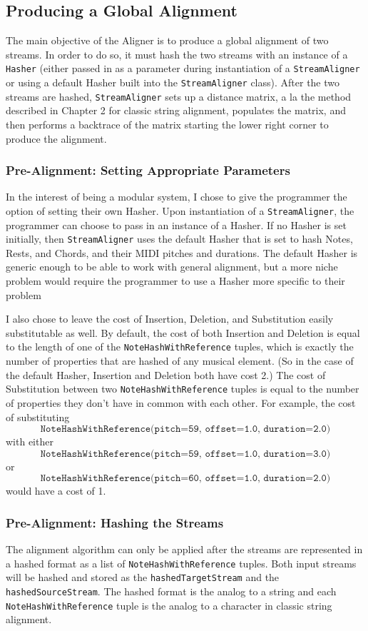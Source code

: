 \subsection{Producing a Global Alignment}
The main objective of the Aligner is to produce a global alignment of two streams. In order to do so, it must hash the two streams with an instance of a \texttt{Hasher} (either passed in as a parameter during instantiation of a \texttt{StreamAligner} or using a default Hasher built into the \texttt{StreamAligner} class). After the two streams are hashed, \texttt{StreamAligner} sets up a distance matrix, a la the method described in Chapter 2 for classic string alignment, populates the matrix, and then performs a backtrace of the matrix starting the lower right corner to produce the alignment.

\subsubsection{Pre-Alignment: Setting Appropriate Parameters}
In the interest of being a modular system, I chose to give the programmer the option of setting their own Hasher. Upon instantiation of a \texttt{StreamAligner}, the programmer can choose to pass in an instance of a Hasher. If no Hasher is set initially, then \texttt{StreamAligner} uses the default Hasher that is set to hash Notes, Rests, and Chords, and their MIDI pitches and durations. The default Hasher is generic enough to be able to work with general alignment, but a more niche problem would require the programmer to use a Hasher more specific to their problem

I also chose to leave the cost of Insertion, Deletion, and Substitution easily substitutable as well. By default, the cost of both Insertion and Deletion is equal to the length of one of the \texttt{NoteHashWithReference} tuples, which is exactly the number of properties that are hashed of any musical element. (So in the case of the default Hasher, Insertion and Deletion both have cost 2.) The cost of Substitution between two \texttt{NoteHashWithReference} tuples is equal to the number of properties they don't have in common with each other. For example, the cost of substituting 
$$ \texttt{NoteHashWithReference(pitch=59, offset=1.0, duration=2.0)} $$
with either 
$$\texttt{NoteHashWithReference(pitch=59, offset=1.0, duration=3.0)} $$ or 
$$\texttt{NoteHashWithReference(pitch=60, offset=1.0, duration=2.0)} $$
would have a cost of 1. 

\subsubsection{Pre-Alignment: Hashing the Streams}
The alignment algorithm can only be applied after the streams are represented in a hashed format as a list of \texttt{NoteHashWithReference} tuples. Both input streams will be hashed and stored as the \texttt{hashedTargetStream} and the \texttt{hashedSourceStream}. The hashed format is the analog to a string and each \texttt{NoteHashWithReference} tuple is the analog to a character in classic string alignment.

